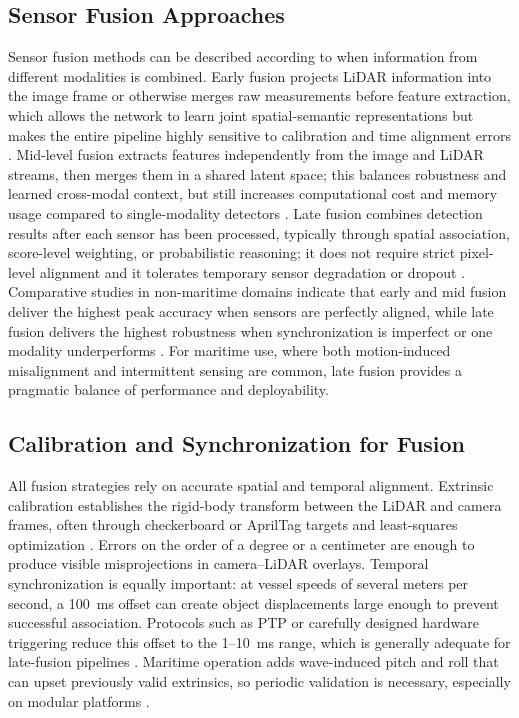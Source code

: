 \documentclass[../main.tex]{subfiles}
\begin{document}
\subsection{Sensor Fusion Approaches}
Sensor fusion methods can be described according to when information from different modalities is combined. Early fusion projects LiDAR information into the image frame or otherwise merges raw measurements before feature extraction, which allows the network to learn joint spatial-semantic representations but makes the entire pipeline highly sensitive to calibration and time alignment errors \cite{vora2020, chen2017}. Mid-level fusion extracts features independently from the image and LiDAR streams, then merges them in a shared latent space; this balances robustness and learned cross-modal context, but still increases computational cost and memory usage compared to single-modality detectors \cite{ku2018, li2022deepfusion, liu2023bevfusion}. Late fusion combines detection results after each sensor has been processed, typically through spatial association, score-level weighting, or probabilistic reasoning; it does not require strict pixel-level alignment and it tolerates temporary sensor degradation or dropout \cite{liang2022, xu2023, qi2021}. Comparative studies in non-maritime domains indicate that early and mid fusion deliver the highest peak accuracy when sensors are perfectly aligned, while late fusion delivers the highest robustness when synchronization is imperfect or one modality underperforms \cite{bai2022transfusion, li2022deepfusion}. For maritime use, where both motion-induced misalignment and intermittent sensing are common, late fusion provides a pragmatic balance of performance and deployability.

\subsection{Calibration and Synchronization for Fusion}
All fusion strategies rely on accurate spatial and temporal alignment. Extrinsic calibration establishes the rigid-body transform between the LiDAR and camera frames, often through checkerboard or AprilTag targets and least-squares optimization \cite{iyer2018, yuan2020}. Errors on the order of a degree or a centimeter are enough to produce visible misprojections in camera–LiDAR overlays. Temporal synchronization is equally important: at vessel speeds of several meters per second, a 100~ms offset can create object displacements large enough to prevent successful association. Protocols such as PTP or carefully designed hardware triggering reduce this offset to the 1–10~ms range, which is generally adequate for late-fusion pipelines \cite{bijelic2020}. Maritime operation adds wave-induced pitch and roll that can upset previously valid extrinsics, so periodic validation is necessary, especially on modular platforms \cite{halterman2015}.
\end{document}
